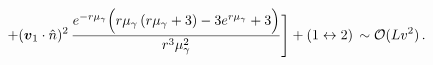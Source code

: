 \begin{itemize}
\begin{align}
\begin{split}
\,\,\,\,\,\,\,\,\,\,\,\,\,\,\,\,\,\,\,\,\,\,\,\,\,\,\,\,\,
+(\boldsymbol{v}_1\cdot \Hat{n})^2\,\frac{e^{-r \mu _{\gamma }} \Big(r \mu _{\gamma } \left(r \mu _{\gamma }+3\right)-3 e^{r \mu _{\gamma }}+3\Big)}{  r^3 \mu _{\gamma }^2}
\Bigg]+(1\leftrightarrow 2)\,\sim \mathcal{O}(L v^2)\,.
\end{split}
\end{align}


\end{itemize}
